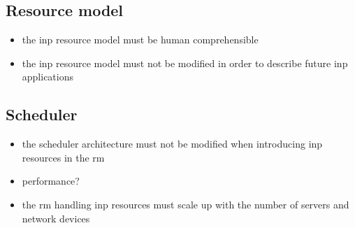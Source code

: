 \subsection{Resource model}
\begin{itemize}
    \item the \gls{inp} resource model must be human comprehensible
    \item the \gls{inp} resource model must not be modified in order to describe future \gls{inp} applications
\end{itemize}

\subsection{Scheduler}
\begin{itemize}
    \item the scheduler architecture must not be modified when introducing \gls{inp} resources in the \gls{rm}
    \item performance?
    \item the \gls{rm} handling \gls{inp} resources must scale up with the number of servers and network devices
\end{itemize}